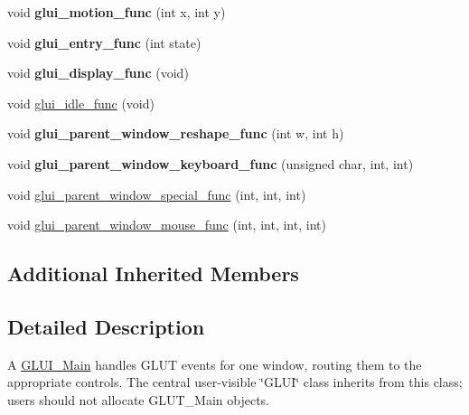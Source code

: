 \begin{DoxyCompactItemize}
\item 
\hypertarget{classGLUI__Main_a633765a3cd774bd7521a679eb4a51f2f}{void {\bfseries glui\-\_\-motion\-\_\-func} (int x, int y)}\label{classGLUI__Main_a633765a3cd774bd7521a679eb4a51f2f}

\item 
\hypertarget{classGLUI__Main_ac1a3c6ebc56cb90a076c62b9192853e8}{void {\bfseries glui\-\_\-entry\-\_\-func} (int state)}\label{classGLUI__Main_ac1a3c6ebc56cb90a076c62b9192853e8}

\item 
\hypertarget{classGLUI__Main_a02c2a5886dd1faabe8b882da67f77457}{void {\bfseries glui\-\_\-display\-\_\-func} (void)}\label{classGLUI__Main_a02c2a5886dd1faabe8b882da67f77457}

\item 
void \hyperlink{classGLUI__Main_a6d56019c7f67cab2a97457b11e0b8994}{glui\-\_\-idle\-\_\-func} (void)
\item 
\hypertarget{classGLUI__Main_aba8acedae32a786d382d229db7728ee4}{void {\bfseries glui\-\_\-parent\-\_\-window\-\_\-reshape\-\_\-func} (int w, int h)}\label{classGLUI__Main_aba8acedae32a786d382d229db7728ee4}

\item 
\hypertarget{classGLUI__Main_aff7ae88a0a9221d06fd6712875970c58}{void {\bfseries glui\-\_\-parent\-\_\-window\-\_\-keyboard\-\_\-func} (unsigned char, int, int)}\label{classGLUI__Main_aff7ae88a0a9221d06fd6712875970c58}

\item 
void \hyperlink{classGLUI__Main_ab729b572b9acaffe3ebc827b6cfd72ca}{glui\-\_\-parent\-\_\-window\-\_\-special\-\_\-func} (int, int, int)
\item 
void \hyperlink{classGLUI__Main_a391c1191451c678e7702e593e74dc5a4}{glui\-\_\-parent\-\_\-window\-\_\-mouse\-\_\-func} (int, int, int, int)
\end{DoxyCompactItemize}
\subsection*{Additional Inherited Members}


\subsection{Detailed Description}
A \hyperlink{classGLUI__Main}{G\-L\-U\-I\-\_\-\-Main} handles G\-L\-U\-T events for one window, routing them to the appropriate controls. The central user-\/visible \char`\"{}\-G\-L\-U\-I\char`\"{} class inherits from this class; users should not allocate G\-L\-U\-T\-\_\-\-Main objects.


